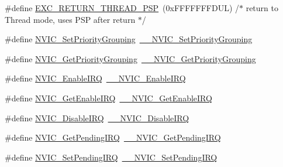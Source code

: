 \begin{DoxyCompactItemize}
\item 
\#define \hyperlink{group___c_m_s_i_s___core___n_v_i_c_functions_ga9998daf0fbdf31dbc8f81cd604b58175}{E\+X\+C\+\_\+\+R\+E\+T\+U\+R\+N\+\_\+\+T\+H\+R\+E\+A\+D\+\_\+\+P\+SP}~(0x\+F\+F\+F\+F\+F\+F\+F\+D\+U\+L)     /$\ast$ return to Thread mode, uses P\+S\+P after return                                $\ast$/
\item 
\#define \hyperlink{group___c_m_s_i_s___core___n_v_i_c_functions_ga0e798d5aec68cdd8263db86a76df788f}{N\+V\+I\+C\+\_\+\+Set\+Priority\+Grouping}~\hyperlink{group___c_m_s_i_s___core___n_v_i_c_functions_gafc94dcbaee03e4746ade1f5bb9aaa56d}{\+\_\+\+\_\+\+N\+V\+I\+C\+\_\+\+Set\+Priority\+Grouping}
\item 
\#define \hyperlink{group___c_m_s_i_s___core___n_v_i_c_functions_ga4eeb9214f2264fc23c34ad5de2d3fa11}{N\+V\+I\+C\+\_\+\+Get\+Priority\+Grouping}~\hyperlink{group___c_m_s_i_s___core___n_v_i_c_functions_ga9b894af672df4373eb637f8288845c05}{\+\_\+\+\_\+\+N\+V\+I\+C\+\_\+\+Get\+Priority\+Grouping}
\item 
\#define \hyperlink{group___c_m_s_i_s___core___n_v_i_c_functions_ga57b3064413dbc7459d9646020fdd8bef}{N\+V\+I\+C\+\_\+\+Enable\+I\+RQ}~\hyperlink{group___c_m_s_i_s___core___n_v_i_c_functions_ga71227e1376cde11eda03fcb62f1b33ea}{\+\_\+\+\_\+\+N\+V\+I\+C\+\_\+\+Enable\+I\+RQ}
\item 
\#define \hyperlink{group___c_m_s_i_s___core___n_v_i_c_functions_ga857de13232ec65dd15087eaa15bc4a69}{N\+V\+I\+C\+\_\+\+Get\+Enable\+I\+RQ}~\hyperlink{group___c_m_s_i_s___core___n_v_i_c_functions_gaaeb5e7cc0eaad4e2817272e7bf742083}{\+\_\+\+\_\+\+N\+V\+I\+C\+\_\+\+Get\+Enable\+I\+RQ}
\item 
\#define \hyperlink{group___c_m_s_i_s___core___n_v_i_c_functions_ga73b4e251f59cab4e9a5e234aac02ae57}{N\+V\+I\+C\+\_\+\+Disable\+I\+RQ}~\hyperlink{group___c_m_s_i_s___core___n_v_i_c_functions_gae016e4c1986312044ee768806537d52f}{\+\_\+\+\_\+\+N\+V\+I\+C\+\_\+\+Disable\+I\+RQ}
\item 
\#define \hyperlink{group___c_m_s_i_s___core___n_v_i_c_functions_gac608957a239466e9e0cbc30aa64feb3b}{N\+V\+I\+C\+\_\+\+Get\+Pending\+I\+RQ}~\hyperlink{group___c_m_s_i_s___core___n_v_i_c_functions_ga5a92ca5fa801ad7adb92be7257ab9694}{\+\_\+\+\_\+\+N\+V\+I\+C\+\_\+\+Get\+Pending\+I\+RQ}
\item 
\#define \hyperlink{group___c_m_s_i_s___core___n_v_i_c_functions_ga2b47e2e52cf5c48a5c3348636434b3ac}{N\+V\+I\+C\+\_\+\+Set\+Pending\+I\+RQ}~\hyperlink{group___c_m_s_i_s___core___n_v_i_c_functions_gaabefdd4b790b9a7308929938c0c1e1ad}{\+\_\+\+\_\+\+N\+V\+I\+C\+\_\+\+Set\+Pending\+I\+RQ}

\end{DoxyCompactItemize}
